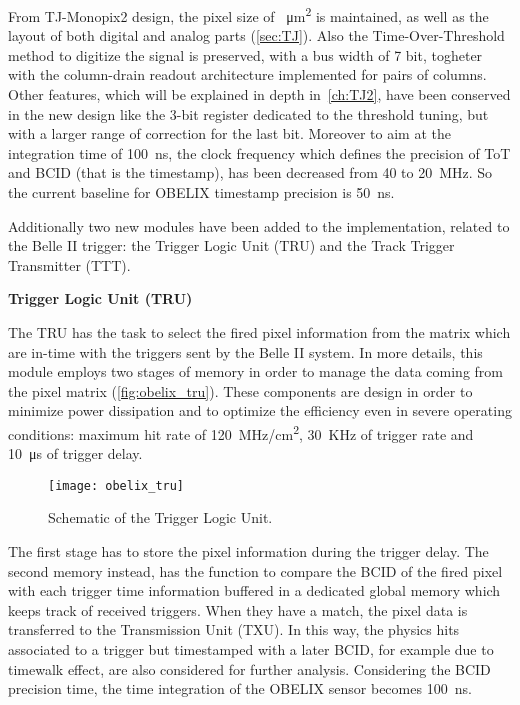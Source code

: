From TJ-Monopix2 design, the pixel size of ~\unit{\micro m^{2}} is maintained, as well as the layout of both digital and analog parts (\autoref{sec:TJ}). Also the Time-Over-Threshold method to digitize the signal is preserved, with a bus width of 7 bit, togheter with the column-drain readout architecture implemented for pairs of columns. Other features, which will be explained in depth in~\autoref{ch:TJ2}, have been conserved in the new design like the 3-bit register dedicated to the threshold tuning, but with a larger range of correction for the last bit. 
Moreover to aim at the integration time of \SI{100}{ns}, the clock frequency which defines the precision of ToT and BCID (that is the timestamp), has been decreased from 40 to \SI{20}{MHz}. So the current baseline for OBELIX timestamp precision is \SI{50}{ns}.

Additionally two new modules have been added to the implementation, related to the Belle II trigger: the Trigger Logic Unit (TRU) and the Track Trigger Transmitter (TTT). 

\begin{description}
\item \textbf{Trigger Logic Unit (TRU)}
\end{description}

The TRU has the task to select the fired pixel information from the matrix which are in-time with the triggers sent by the Belle II system. In more details, this module employs two stages of memory in order to manage the data coming from the pixel matrix (\autoref{fig:obelix_tru}). These components are design in order to minimize power dissipation and to optimize the efficiency even in severe operating conditions: maximum hit rate of \SI{120}{MHz/cm^{2}}, \SI{30}{KHz} of trigger rate and \SI{10}{\micro s} of trigger delay.

\begin{figure}[h!]
\centering
\texttt{[image: obelix\_tru]}
\caption{Schematic of the Trigger Logic Unit.}
\label{fig:obelix_tru}
\end{figure}

The first stage has to store the pixel information during the trigger delay. The second memory instead, has the function to compare the BCID of the fired pixel with each trigger time information buffered in a dedicated global memory which keeps track of received triggers. When they have a match, the pixel data is transferred to the Transmission Unit (TXU). In this way, the physics hits associated to a trigger but timestamped with a later BCID, for example due to timewalk effect, are also considered for further analysis.
Considering the BCID precision time, the time integration of the OBELIX sensor becomes \SI{100}{ns}.



